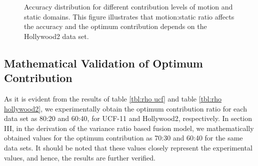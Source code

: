 \begin{figure}
\caption{Accuracy distribution for different contribution levels of motion and static domains.
This figure illustrates that motion:static ratio affects the accuracy and the optimum contribution depends on the Hollywood2 data set.}
\label{contribution chart}
\end{figure}

\subsection{Mathematical Validation of Optimum Contribution}

As it is evident from the results of table \ref{tbl:rho ucf} and table \ref{tbl:rho hollywood2}, we experimentally obtain the
optimum contribution ratio for each data set as 80:20 and 60:40, for UCF-11 and Hollywood2, respectively. In section III, in the derivation of the variance ratio based fusion model,
we mathematically obtained values for the optimum contribution as 70:30 and 60:40 for the same data sets. It should be noted that these values closely
represent the experimental values, and hence, the results are further verified.

